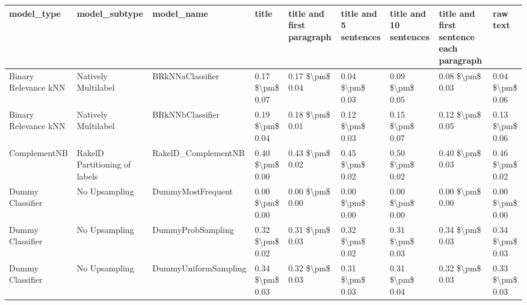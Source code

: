 \begin{tabular}{lllllllll}
\toprule
                     model\_type &                 model\_subtype &                                   model\_name &           title & title and first paragraph & title and 5 sentences & title and 10 sentences & title and first sentence each paragraph &            raw text \\
\midrule
           Binary Relevance kNN &           Natively Multilabel &                             BRkNNaClassifier & 0.17 \$\textbackslash pm\$ 0.07 &           0.17 \$\textbackslash pm\$ 0.04 &       0.04 \$\textbackslash pm\$ 0.03 &        0.09 \$\textbackslash pm\$ 0.05 &                         0.08 \$\textbackslash pm\$ 0.03 &     0.04 \$\textbackslash pm\$ 0.06 \\
           Binary Relevance kNN &           Natively Multilabel &                             BRkNNbClassifier & 0.19 \$\textbackslash pm\$ 0.04 &           0.18 \$\textbackslash pm\$ 0.01 &       0.12 \$\textbackslash pm\$ 0.03 &        0.15 \$\textbackslash pm\$ 0.07 &                         0.12 \$\textbackslash pm\$ 0.05 &     0.13 \$\textbackslash pm\$ 0.06 \\
                   ComplementNB & RakelD Partitioning of labels &                          RakelD\_ComplementNB & 0.40 \$\textbackslash pm\$ 0.00 &           0.43 \$\textbackslash pm\$ 0.02 &       0.45 \$\textbackslash pm\$ 0.02 &        0.50 \$\textbackslash pm\$ 0.02 &                         0.40 \$\textbackslash pm\$ 0.03 &     0.46 \$\textbackslash pm\$ 0.02 \\
               Dummy Classifier &                 No Upsampling &                            DummyMostFrequent & 0.00 \$\textbackslash pm\$ 0.00 &           0.00 \$\textbackslash pm\$ 0.00 &       0.00 \$\textbackslash pm\$ 0.00 &        0.00 \$\textbackslash pm\$ 0.00 &                         0.00 \$\textbackslash pm\$ 0.00 &     0.00 \$\textbackslash pm\$ 0.00 \\
               Dummy Classifier &                 No Upsampling &                            DummyProbSampling & 0.32 \$\textbackslash pm\$ 0.02 &           0.31 \$\textbackslash pm\$ 0.03 &       0.32 \$\textbackslash pm\$ 0.02 &        0.31 \$\textbackslash pm\$ 0.03 &                         0.34 \$\textbackslash pm\$ 0.03 &     0.34 \$\textbackslash pm\$ 0.03 \\
               Dummy Classifier &                 No Upsampling &                         DummyUniformSampling & 0.34 \$\textbackslash pm\$ 0.03 &           0.32 \$\textbackslash pm\$ 0.03 &       0.31 \$\textbackslash pm\$ 0.03 &        0.31 \$\textbackslash pm\$ 0.04 &                         0.32 \$\textbackslash pm\$ 0.03 &     0.33 \$\textbackslash pm\$ 0.03 \\

\end{tabular}
